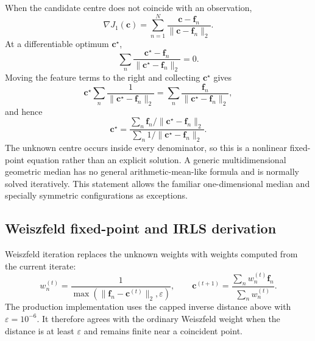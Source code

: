 When the candidate centre does not coincide with an observation,
\begin{equation}
    \nabla J_1(\bm c)
    =\sum_{n=1}^{N}
      \frac{\bm c-\bm f_n}{\|\bm c-\bm f_n\|_2}.
\end{equation}
At a differentiable optimum $\bm c^\star$,
\begin{equation}
    \sum_n
    \frac{\bm c^\star-\bm f_n}
         {\|\bm c^\star-\bm f_n\|_2}=0.
\end{equation}
Moving the feature terms to the right and collecting $\bm c^\star$ gives
\begin{equation}
    \bm c^\star
    \sum_n\frac{1}{\|\bm c^\star-\bm f_n\|_2}
    =
    \sum_n\frac{\bm f_n}{\|\bm c^\star-\bm f_n\|_2},
\end{equation}
and hence
\begin{equation}
    \boxed{
    \bm c^\star=
    \frac{\displaystyle\sum_n
          \bm f_n/\|\bm c^\star-\bm f_n\|_2}
         {\displaystyle\sum_n
          1/\|\bm c^\star-\bm f_n\|_2}.}
\end{equation}
The unknown centre occurs inside every denominator, so this is a nonlinear
fixed-point equation rather than an explicit solution. A generic
multidimensional geometric median has no general arithmetic-mean-like formula
and is normally solved iteratively. This statement allows the familiar
one-dimensional median and specially symmetric configurations as exceptions.

\subsection{Weiszfeld fixed-point and IRLS derivation}

Weiszfeld iteration replaces the unknown weights with weights computed from the
current iterate:
\begin{equation}
    w_n^{(t)}=
    \frac{1}{\max\!\left(\|\bm f_n-\bm c^{(t)}\|_2,\varepsilon\right)},
    \qquad
    \bm c^{(t+1)}=
    \frac{\sum_nw_n^{(t)}\bm f_n}{\sum_nw_n^{(t)}}.
\end{equation}
The production implementation uses the capped inverse distance above with
$\varepsilon=10^{-6}$. It therefore agrees with the ordinary Weiszfeld weight
when the distance is at least $\varepsilon$ and remains finite near a
coincident point.

